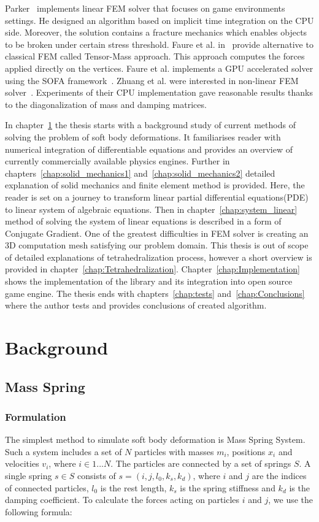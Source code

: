 \documentclass[en]{minipw} %
\begin{document}
Parker~\cite{parker} implements linear FEM solver that focuses on game environments settings. He designed an algorithm based on implicit time integration on the CPU side. Moreover, the solution contains a fracture mechanics which enables objects to be broken under certain stress threshold.
Faure et al. in~\cite{tensor-mass} provide alternative to classical FEM called Tensor-Mass approach. This approach computes the forces applied directly on the vertices. Faure et al. implements a GPU accelerated solver using the SOFA framework~\cite{sofa}.
Zhuang et al. were interested in non-linear FEM solver~\cite{global_deformation}. Experiments of their CPU implementation gave reasonable results thanks to the diagonalization of mass and damping matrices.

In chapter~\ref{chap:background} the thesis starts with a background study of current methods of solving the problem of soft body deformations. It familiarises reader with numerical integration of differentiable equations and provides an overview of currently commercially available physics engines.
Further in chapters~\ref{chap:solid_mechanics1} and~\ref{chap:solid_mechanics2} detailed explanation of solid mechanics and finite element method is provided. Here, the reader is set on a journey to transform linear partial differential equations(PDE) to linear system of algebraic equations. Then in chapter~\ref{chap:system_linear} method of solving the system of linear equations is described in a form of  Conjugate Gradient.
One of the greatest difficulties in FEM solver is creating an 3D computation mesh satisfying our problem domain. This thesis is out of scope of detailed explanations of tetrahedralization process, however a short overview is provided in chapter~\ref{chap:Tetrahedralization}.
Chapter~\ref{chap:Implementation} shows the implementation of the library and its integration into open source game engine.
The thesis ends with chapters~\ref{chap:tests} and~\ref{chap:Conclusions} where the author tests and provides conclusions of created algorithm.

\chapter{Background}
\label{chap:background}

\section{Mass Spring}
\subsection{Formulation}
The simplest method to simulate soft body deformation is Mass Spring System.
Such a system includes a set of $N$ particles with masses $m_i$, positions $x_i$ and velocities $v_i$, where $i \in 1...N$. The particles are connected by a set of springs $S$. A single spring $s \in S$ consists of $s = (i, j, l_0, k_s, k_d)$, where $i$ and $j$ are the indices of connected particles, $l_0$ is the rest length, $k_s$ is the spring stiffness and $k_d$ is the damping coefficient. To calculate the forces acting on particles $i$ and $j$, we use the following formula:
\end{document}
